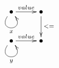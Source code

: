 $\xymatrix{
   \bullet \ar@(dl,dr)[]_{x} \ar[r]^{value} & \bullet \ar[d]^{<=} \\
   \bullet \ar@(dl,dr)[]_{y} \ar[r]^{value} & \bullet
}$
